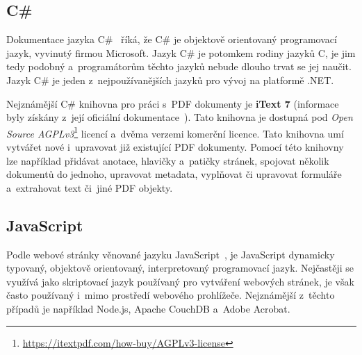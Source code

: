 \subsection*{C\#}

Dokumentace jazyka C\#~\cite{CSharp} říká, že  C\# je objektově orientovaný 
programovací jazyk, vyvinutý firmou Microsoft.
Jazyk C\# je potomkem rodiny jazyků C, je jim tedy podobný a~programátorům těchto
jazyků nebude dlouho trvat se jej naučit. Jazyk C\# je jeden z~nejpoužívanějších
jazyků pro vývoj na platformě .NET.

Nejznámější C\# knihovna pro práci s~PDF dokumenty je \textbf{iText 7}
(informace byly získány z~její oficiální dokumentace~\cite{iText_7}). 
Tato knihovna je dostupná pod \emph{Open Source AGPLv3}\footnote{
\href{https://itextpdf.com/how-buy/AGPLv3-license}{https://itextpdf.com/how-buy/AGPLv3-license}
} licencí a~dvěma verzemi komerční licence. Tato knihovna umí vytvářet nové
i~upravovat již existující PDF dokumenty. Pomocí této knihovny lze například
přidávat anotace, hlavičky a~patičky stránek, spojovat několik dokumentů do
jednoho, upravovat metadata, vyplňovat či upravovat formuláře a~extrahovat 
text či~jiné PDF objekty.


\subsection*{JavaScript}
Podle webové stránky věnované jazyku JavaScript~\cite{JavaScript}, je
JavaScript dynamicky typovaný, objektově orientovaný, interpretovaný
programovací jazyk. Nejčastěji se využívá jako skriptovací jazyk používaný
pro vytváření webových stránek, je však často používaný i~mimo prostředí webového
prohlížeče. Nejznámější z~těchto případů je například Node.js, Apache CouchDB
a~Adobe Acrobat. 

